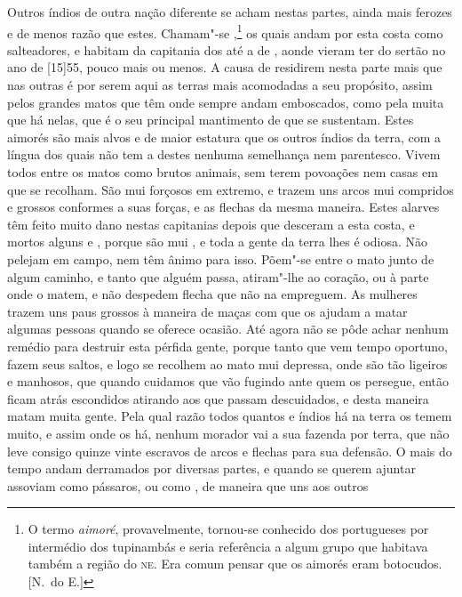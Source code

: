Outros índios de outra nação diferente se acham nestas partes, ainda mais
ferozes e de menos razão que estes. Chamam"-se ,\footnote{ O
termo \textit{aimoré}, provavelmente, tornou-se conhecido 
dos portugueses por intermédio dos tupinambás e seria referência a algum grupo que
habitava também a região do \textsc{ne}. Era comum
pensar que os aimorés eram botocudos. [N.~do E.]}
os quais andam									%
por esta costa como salteadores, e habitam da capitania dos  até
a de , aonde vieram ter do sertão no ano de [15]55, pouco mais
ou menos. A causa de residirem nesta parte mais que nas outras é por
serem aqui as terras mais acomodadas a seu propósito, assim pelos
grandes matos que têm onde sempre andam emboscados, como pela muita
 que há nelas, que é o seu principal mantimento de que se
sustentam. Estes aimorés são mais alvos e de maior estatura que os
outros índios da terra, com a língua dos quais não tem a destes nenhuma			%
semelhança nem parentesco. Vivem todos entre os matos como brutos
animais, sem terem povoações nem casas em que se recolham. São mui
forçosos em extremo, e trazem uns arcos mui compridos e grossos
conformes a suas forças, e as flechas da mesma maneira. Estes alarves
têm feito muito dano nestas capitanias depois que desceram a esta
costa, e mortos alguns  e , porque são mui ,
e toda a gente da terra lhes é odiosa. Não pelejam em campo, nem têm
ânimo para isso. Põem"-se entre o mato junto de algum caminho, e tanto
que alguém passa, atiram"-lhe ao coração, ou à parte onde o matem, e não
despedem flecha que não na empreguem. As mulheres trazem uns paus
grossos à maneira de maças com que os ajudam a matar algumas pessoas
quando se oferece ocasião. Até agora não se pôde achar nenhum remédio
para destruir esta pérfida gente, porque tanto que vem tempo oportuno,
fazem seus saltos, e logo se recolhem ao mato mui depressa, onde são
tão ligeiros e manhosos, que quando cuidamos que vão fugindo ante quem
os persegue, então ficam atrás escondidos atirando aos que passam
descuidados, e desta maneira matam muita gente. Pela qual razão todos
quantos  e índios há na terra os temem muito, e assim onde os 	%
há, nenhum morador vai a sua fazenda por terra, que não leve consigo
quinze vinte escravos de arcos e flechas para sua defensão. O mais do
tempo andam derramados por diversas partes, e quando se querem ajuntar
assoviam como pássaros, ou como , de maneira que uns aos outros
